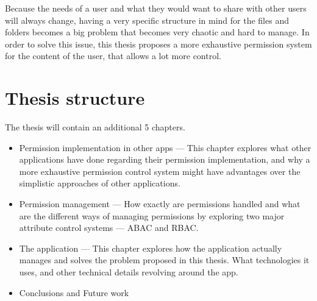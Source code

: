 Because the needs of a user and what they would want to share with other users will always change, having a very specific structure in mind for the files and folders becomes a big problem that becomes very chaotic and hard to manage. In order to solve this issue, this thesis proposes a more exhaustive permission system for the content of the user, that allows a lot more control.

\section{Thesis structure}
The thesis will contain an additional 5 chapters.
\begin{itemize}
    \item Permission implementation in other apps --- This chapter explores what other applications have done regarding their permission implementation, and why a more exhaustive permission control system might have advantages over the simplistic approaches of other applications.
    \item Permission management --- How exactly are permissions handled and what are the different ways of managing permissions by exploring two major attribute control systems --- ABAC and RBAC.
    \item The application --- This chapter explores how the application actually manages and solves the problem proposed in this thesis. What technologies it uses, and other technical details revolving around the app.
    \item Conclusions and Future work
\end{itemize}
